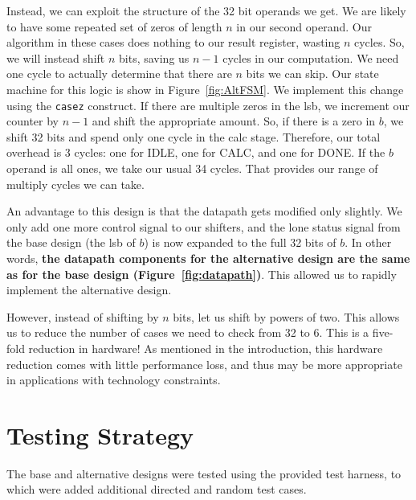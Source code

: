 \documentclass[10pt]{article}
\begin{document}
Instead, we can exploit the structure of the 32 bit operands we get.
We are likely to have some repeated set of zeros of length $n$ in our second operand.
Our algorithm in these cases does nothing to our result register, wasting $n$ cycles.
So, we will instead shift $n$ bits, saving us $n-1$ cycles in our computation.
We need one cycle to actually determine that there are $n$ bits we can skip.
Our state machine for this logic is show in Figure~\ref{fig:AltFSM}.
We implement this change using the \verb+casez+ construct.
If there are multiple zeros in the lsb, we increment our counter by $n-1$ and shift the appropriate amount.
So, if there is a zero in $b$, we shift 32 bits and spend only one cycle in the calc stage.
Therefore, our total overhead is 3 cycles: one for IDLE, one for CALC, and one for DONE.
If the $b$ operand is all ones, we take our usual 34 cycles.
That provides our range of multiply cycles we can take.

An advantage to this design is that the datapath gets modified only slightly.
We only add one more control signal to our shifters, and the lone status signal from the base design (the lsb of $b$) is now expanded to the full 32 bits of $b$.
In other words, \textbf{the datapath components for the alternative design are the same as for the base design (Figure~\ref{fig:datapath})}. 
This allowed us to rapidly implement the alternative design.

However, instead of shifting by $n$ bits, let us shift by powers of two.
This allows us to reduce the number of cases we need to check from 32 to 6.
This is a five-fold reduction in hardware! As mentioned in the introduction, this hardware reduction comes with little performance loss, and thus may be more appropriate in applications with technology constraints. 


\section{Testing Strategy}

The base and alternative designs were tested using the provided test harness, to which were added additional directed and random test cases.
\end{document}
